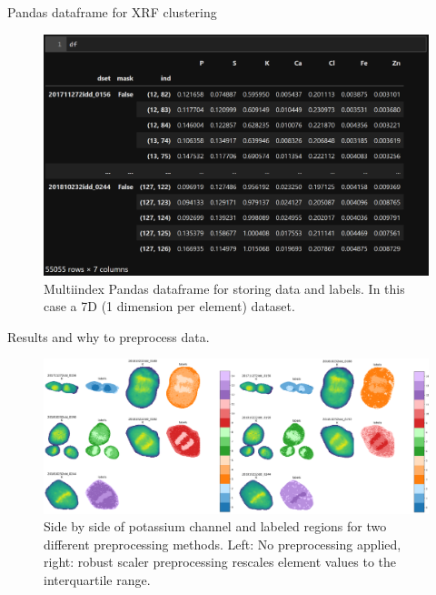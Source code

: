 \documentclass[
]{beamer}
\begin{document}
\begin{frame}{Pandas dataframe for XRF clustering}
\begin{figure}
    \includegraphics[width=1\textwidth,height=.7\textheight,keepaspectratio]{dataframe.PNG}
    \caption{Multiindex Pandas dataframe for storing data and labels. In this case a 7D (1 dimension per element) dataset.}
\end{figure}
\end{frame}

\begin{frame}{Results and why to preprocess data.}
\begin{figure}[h]
  \includegraphics[width=1\textwidth,height=.7\textheight,keepaspectratio]{labels_compare_preprocessing.png}
  \caption{Side by side of potassium channel and labeled regions for two different preprocessing methods. Left: No preprocessing applied, right: robust scaler preprocessing rescales element values to the interquartile range.}
\end{figure}
\end{frame}
\end{document}
